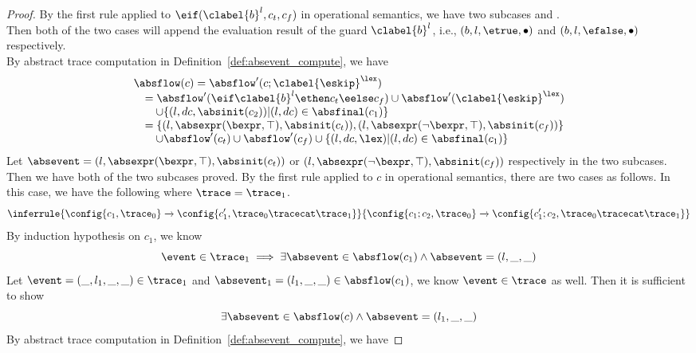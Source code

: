 \begin{proof}
  By the first rule applied to $\eif(\clabel{b}^l, c_t, c_f)$ in operational semantics,
  we have two subcases  and .
  \\
  Then both of the two cases will append the evaluation result of the guard $\clabel{b}^l$, i.e., $(b, l, \etrue, \bullet)$ and $(b, l, \efalse, \bullet)$ respectively.
  \\
  By abstract trace computation in Definition~\ref{def:absevent_compute}, we have
  \[
    \begin{array}{l}
      \absflow(c) = \absflow'(c; \clabel{\eskip}^{\lex}) 
      \\ \quad
      = \absflow'(\eif \clabel{b}^l \ethen c_t \eelse c_f) \cup \absflow'(\clabel{\eskip}^{\lex}) 
      \\ \quad \quad 
      \cup \{ (l, dc, \absinit(c_2)) | (l, dc) \in \absfinal(c_1) \} 
      \\ \quad  
      = \{(l, \absexpr(\bexpr, \top),  \absinit(c_t) ) ,  (l, \absexpr(\neg\bexpr, \top), \absinit(c_f)) \}
      \\ \quad \quad 
      \cup \absflow'(c_t) \cup \absflow'(c_f) 
      \cup \{ (l, dc, \lex) | (l, dc) \in \absfinal(c_1) \} 
   \end{array}
  \]
  Let $\absevent = (l, \absexpr(\bexpr, \top),  \absinit(c_t) ) $ or $ (l, \absexpr(\neg\bexpr, \top), \absinit(c_f)) $
  respectively in the two subcases.
  \\
  Then we have both of the two subcases proved.
  By the first rule applied to $c$ in operational semantics, there are two cases as follows.
  In this case, we have the following where $\trace = \trace_1$.
  \[
    \inferrule
    {
    \config{{c_1, \trace_0}}
    \xrightarrow{}
    \config{{c_1',  \trace_0 \tracecat \trace_1}}
    }
    {
    \config{{c_1; c_2, \trace_0}} 
    \xrightarrow{} 
    \config{{c_1'; c_2, \trace_0 \tracecat \trace_1}}
    }
  \]
  By induction hypothesis on $c_1$, we know 
  \[
    \event \in \trace_1
    \implies
    \exists 
    \absevent \in \absflow(c_1) \land \absevent = (l, \_, \_) 
  \]
  Let $\event = (\_, l_1, \_, \_) \in \trace_1$ and $\absevent_1 = (l_1, \_, \_) \in \absflow(c_1)$, we know $\event \in \trace$ as well.
  Then it is sufficient to show
  \[
    \exists 
    \absevent \in \absflow(c) \land \absevent = (l_1, \_, \_)
  \]
  By abstract trace computation in Definition~\ref{def:absevent_compute}, we have

\end{proof}
